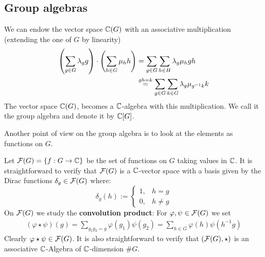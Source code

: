\documentclass[twoside = false,	%
		headsepline,		%
		parskip = true,
		]{scrbook}						%
\begin{document}
    \subsection{Group algebras}
        We can endow the vector space $\mathbb C(G)$ with an associative multiplication (extending the one of $G$ by linearity)
        \begin{equation*}
        \begin{split}
            \left( \sum_{g \in G} \lambda_g g \right) \cdot \left( \sum_{h \in G} \mu_h h\right) &= \sum_{g \in G} \sum_{h \in H} \lambda_g \mu_h gh \\
            &\overset{gh = k}{=} \sum_{g \in G} \sum_{k \in G} \lambda_g \mu_{g^{-1}k} k
        \end{split}
        \end{equation*}
        The vector space $\mathbb C(G)$, becomes a $\mathbb C$-algebra with this multiplication. We call it the group algebra and denote it by $\mathbb C[G]$.
        
        Another point of view on the group algebra is to look at the elements as functions on $G$.

        Let $\mathcal F(G) = \{f:G \to \mathbb C \}$ be the set of functions on $G$ taking values in $\mathbb C$. It is straightforward to verify that $\mathcal F(G)$ is a $\mathbb C$-vector space with a basis given by the Dirac functions $\delta_g \in \mathcal F(G)$ where:
        \begin{equation*}
            \delta_g(h):=\left\{ \begin{array}{cc}
                1, & h=g \\
                0, & h \neq g
            \end{array}\right.
        \end{equation*}
        On $\mathcal F(G)$ we study the \textbf{convolution product}:
        For $\varphi,\psi \in \mathcal F(G)$ we set
        \begin{equation*}
        \begin{split}
            (\varphi \star \psi)(g) = \sum_{g_1g_2 = g} \varphi(g_1)\psi(g_2) = \sum_{h \in G} \varphi(h)\psi(h^{-1}g)
        \end{split}
        \end{equation*}
        Clearly $\varphi \star \psi \in \mathcal F(G)$.
        It is also straightforward to verify that $(\mathcal F(G),\star)$ is an associative $\mathbb C$-Algebra of $\mathbb C$-dimension $\#G$.
\end{document}
